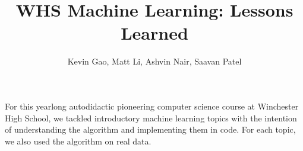 \documentclass[12pt,a4paper]{report}
\author{Kevin Gao,
Matt Li,
Ashvin Nair, Saavan Patel}
\title{WHS Machine Learning: Lessons Learned}
\begin{document}
\maketitle

For this yearlong autodidactic pioneering computer science course at Winchester High School, we tackled introductory machine learning topics with the intention of understanding the algorithm and implementing them in code. For each topic, we also used the algorithm on real data.
\end{document}
